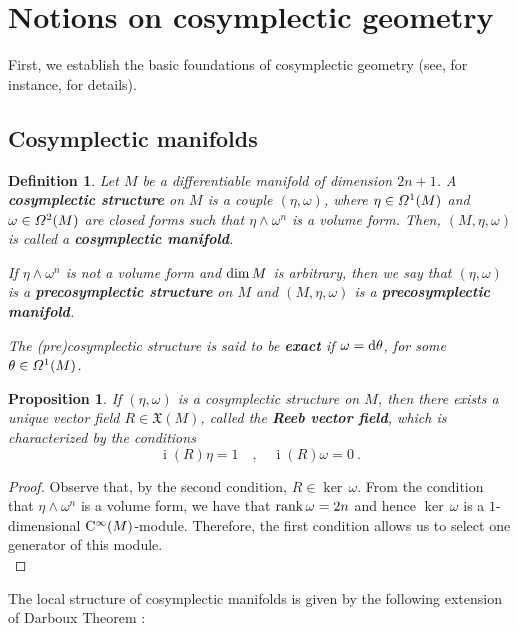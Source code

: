 \documentclass[12pt]{report}
\newtheorem{prop}[teor]{Proposition}
\newtheorem{definition}[teor]{Definition}
\def\beq{\begin{equation}}
\def\eeq{\end{equation}}
\def\qed{\ifvmode\removelastskip\fi
{\unskip\nobreak\hfil\penalty50\hbox{}\nobreak\hfil
\hbox{\vrule height1.2ex width1.2ex}\parfillskip=0pt
\finalhyphendemerits=0 \par\smallskip}}
\def\vf{\mathfrak X}
\def\df{{\mit\Omega}}
\def\d{{\rm d}}
\def\inn{\mathop{i}\nolimits}
\def\Cinfty{{\rm C}^\infty}
\begin{document}
\section{Notions on cosymplectic geometry}


First, we establish the basic foundations of
cosymplectic geometry 
(see, for instance, \cite{CLL-92,dN-2013,CLM-91} for details).


\subsection{Cosymplectic manifolds}


\begin{definition}
\label{deest}
Let $M$ be a differentiable manifold of dimension $2n+1$.
A \textbf{cosymplectic structure}  on $M$ is a couple
$(\eta,\omega)$, where $\eta\in\df^1(M)$ and $\omega\in\df^2(M)$
are closed forms such that
$\eta\wedge\omega^n$ is a volume form.
Then, $(M,\eta,\omega)$ is called a  \textbf{cosymplectic manifold}.

If $\eta\wedge\omega^n$ is not a volume form
and ${\rm dim}\,M$ is arbitrary, then we say that $(\eta,\omega)$
is a \textbf{precosymplectic structure}  on $M$ and
$(M,\eta,\omega)$ is a  \textbf{precosymplectic manifold}.

The (pre)cosymplectic structure is said to be \textbf{exact} if 
$\omega =\d \theta$, for some $\theta\in\df^1(M)$.
\end{definition}

\begin{prop}
If $(\eta ,\omega)$ is a cosymplectic structure on $M$,
then there exists a unique vector field
$R\in\vf(M)$, called the \textbf{Reeb vector field},
which is characterized by the conditions
\beq
\inn(R)\eta=1 \quad ,\quad \inn(R)\omega=0 \ .
\label{rvf}
\eeq
\end{prop}
\begin{proof}
Observe that, by the second condition, $R\in\ker\,\omega$.
From the condition that $\eta\wedge\omega^n$ is a volume form,
we have that ${\rm rank}\,\omega=2n$ and hence
$\ker\,\omega$ is a $1$-dimensional $\Cinfty(M)$-module.
Therefore, the first condition allows us to select one generator of this module.
\\ \qed \end{proof}

The local structure of cosymplectic manifolds is given by the following extension of Darboux Theorem  \cite{dLe89,dLGRR-2023}:
\end{document}
